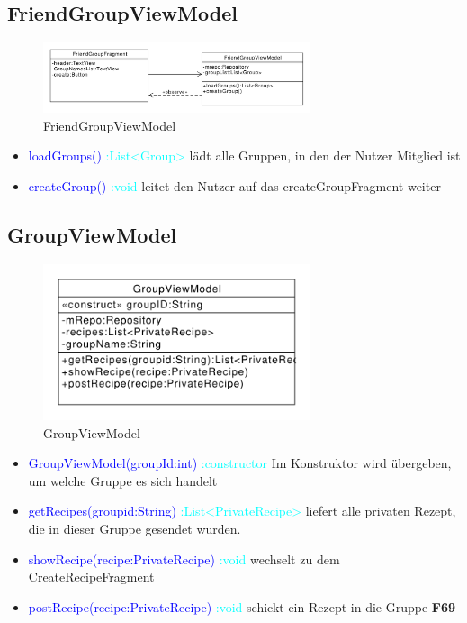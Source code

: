 \subsection{FriendGroupViewModel}
\begin{figure}[H]
	\centering
	\includegraphics[width=0.7\textwidth]{pics/viewModel/Friend_Group_ViewModel.pdf}%
	\caption{FriendGroupViewModel}%
	\label{viewModel}%
\end{figure}
\begin{itemize}
	\item \textcolor{blue}{loadGroups()} \textcolor{cyan}{:List<Group>}
	lädt alle Gruppen, in den der Nutzer Mitglied ist
	\item \textcolor{blue}{createGroup()} \textcolor{cyan}{:void} leitet den Nutzer auf das createGroupFragment weiter
\end{itemize}
 

\subsection{GroupViewModel}
\begin{figure}[H]
	\centering
	\includegraphics[width=0.7\textwidth]{pics/viewModel/Group_ViewModel.pdf}%
	\caption{GroupViewModel}%
	\label{viewModel}%
\end{figure}
\begin{itemize}
	\item \textcolor{blue}{GroupViewModel(groupId:int)} \textcolor{cyan}{:constructor} Im Konstruktor wird übergeben, um welche Gruppe es sich handelt
	\item \textcolor{blue}{getRecipes(groupid:String)} \textcolor{cyan}{:List<PrivateRecipe>}
	liefert alle privaten Rezept, die in dieser Gruppe gesendet wurden.
	
	\item \textcolor{blue}{showRecipe(recipe:PrivateRecipe)} \textcolor{cyan}{:void}
	wechselt zu dem CreateRecipeFragment
	
	\item \textcolor{blue}{postRecipe(recipe:PrivateRecipe)} \textcolor{cyan}{:void} schickt ein Rezept in die Gruppe  \textbf{F69}
\end{itemize}


